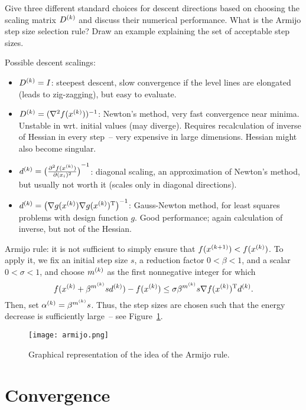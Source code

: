 \documentclass{article}
\begin{document}
\begin{question}
  Give three different standard choices for descent directions based on choosing the scaling matrix
  \(\kth{D}\) and discuss their numerical performance. What is the Armijo step size selection
  rule? Draw an example explaining the set of acceptable step sizes.
\end{question}
Possible descent scalings:
\begin{itemize}
\item \(\kth{D} = I\): steepest descent, slow convergence if the level lines are elongated (leads to
  zig-zagging), but easy to evaluate.
\item \(\kth{D} = (\nabla^2 f(\kth{x}))^{-1}\): Newton's method, very fast convergence near minima.
  Unstable in wrt. initial values (may diverge).  Requires recalculation of inverse of Hessian in
  every step~-- very expensive in large dimensions.  Hessian might also become singular.
\item \(\kth{d} = \del[1]{\pd[2]{f(\kth{x})}{(x_i)}}^{-1}\): diagonal scaling, an approximation of
  Newton's method, but usually not worth it (scales only in diagonal directions).
\item \(\kth{d} = \del[1]{\nabla g(\kth{x}) \T{\nabla g(\kth{x})}}^{-1}\): Gauss-Newton method, for
  least squares problems with design function \(g\). Good performance; again calculation of inverse,
  but not of the Hessian.
\end{itemize}

Armijo rule: it is not sufficient to simply ensure that \(f(\kth[k+1]{x}) < f(\kth{x})\). To apply
it, we fix an initial step size \(s\), a reduction factor \(0 < \beta < 1\), and a scalar
\(0 < \sigma < 1\), and choose \(\kth{m}\) as the first nonnegative integer for which
\begin{equation*}
  f(\kth{x} + \beta^{\kth{m}} s \kth{d}) - f(\kth{x}) \leq \sigma \beta^{\kth{m}} s \nabla \T{f(\kth{x})} \kth{d}.
\end{equation*}
Then, set \(\kth{\alpha} = \beta^{\kth{m}} s\).  Thus, the step sizes are chosen such that the
energy decrease is sufficiently large~-- see Figure~\ref{fig:armijo}.
\begin{figure}[H]
  \centering
  \texttt{[image: armijo.png]}
  \caption{Graphical representation of the idea of the Armijo rule.\label{fig:armijo}}
\end{figure}


\section{Convergence}
\end{document}
